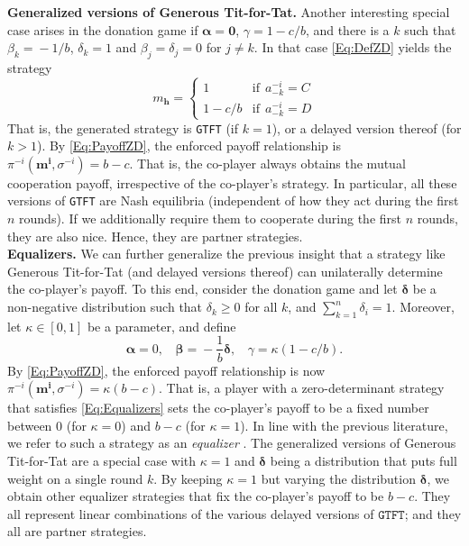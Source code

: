 \documentclass[9pt,twoside,lineno]{pnas-new}
\theoremstyle{plainCl1}
\theoremstyle{plainCl2}
\def\gtft{\texttt{GTFT}}
\begin{document}
\noindent
{\bf Generalized versions of Generous Tit-for-Tat.}
Another interesting special case arises in the donation game if $\boldsymbol{\alpha}\!=\! \boldsymbol{0}$, $\gamma\!=\!1\!-\!c/b$, and there is a $k$ such that $\beta_k\!=\!-1/b$, $\delta_k\!=\!1$ and $\beta_j\!=\!\delta_j\!=\!0$ for $j\!\neq\!k$. 
 In that case \eqref{Eq:DefZD} yields the strategy
\begin{equation*}
m_\mathbf{h} = \left\{
\begin{array}{ll}
1	&\text{if}~~a^{-i}_{-k}=C\\[0.2cm]
1-c/b	&\text{if}~~a^{-i}_{-k}=D
\end{array}
\right.
\end{equation*}
That is, the generated strategy is \gtft{} (if $k\!=\!1$), or a delayed version
thereof (for $k\!>\!1$). By \eqref{Eq:PayoffZD}, the enforced payoff
relationship is $\pi^{-i}(\mathbf{m^{i}}, \sigma^{-i})\!=\!b\!-\!c$. 
That is, the co-player always obtains the mutual cooperation payoff, irrespective of the co-player's strategy. 
In particular, all these versions of \gtft{} are Nash equilibria  (independent of how they act during the first $n$ rounds).
If we additionally require them to cooperate during the first $n$ rounds, they are also nice. 
Hence, they are partner strategies.\\

\noindent
{\bf Equalizers.} We can further generalize the previous insight that a strategy like Generous Tit-for-Tat (and delayed versions thereof) can unilaterally determine the co-player's payoff. To this end, consider the donation game and let $\boldsymbol \delta$ be a non-negative distribution such that $\delta_k\!\ge\!0$ for all $k$, and $\sum_{k=1}^n \delta_i\!=\!1$. Moreover, let $\kappa\!\in\![0,1]$ be a parameter, and define
\begin{equation} \label{Eq:Equalizers}
\boldsymbol \alpha \!=\!0,~~~~
\boldsymbol \beta \!=\! -\frac{1}{b} \boldsymbol \delta,~~~~
\gamma \!=\! \kappa (1\!-\!c/b). 
\end{equation}
By \eqref{Eq:PayoffZD}, the enforced payoff relationship is now $\pi^{-i}(\mathbf{m^{i}}, \sigma^{-i})\!=\!\kappa(b\!-\!c)$. 
That is, a player with a zero-determinant strategy that satisfies \eqref{Eq:Equalizers} sets the co-player's payoff to be a fixed number between 0 (for $\kappa\!=\!0$) and $b\!-\!c$ (for $\kappa\!=\!1$). 
In line with the previous literature, we refer to such a strategy as an {\it equalizer} \citep{boerlijst:AMM:1997,press:PNAS:2012}. 
The generalized versions of Generous Tit-for-Tat are a special case with $\kappa\!=\!1$ and $\boldsymbol{\delta}$ being a distribution that puts full weight on a single round $k$. 
By keeping $\kappa\!=\!1$ but varying the distribution $\boldsymbol \delta$, we obtain other equalizer strategies that fix the co-player's payoff to be $b\!-\!c$. 
They all represent linear combinations of the various delayed versions of $\gtft$; and they all are partner strategies. 
\end{document}
